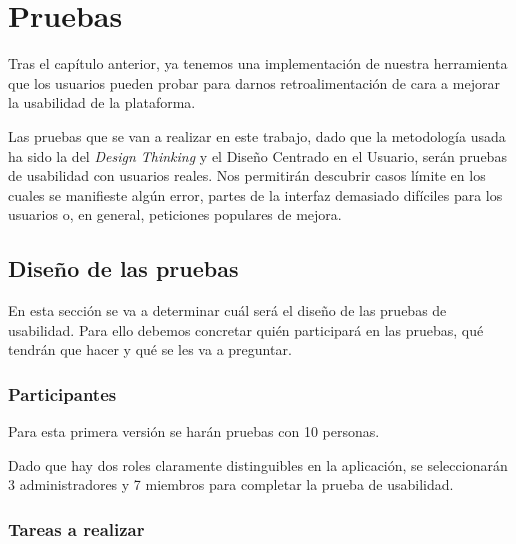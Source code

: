 \chapter{Pruebas}









Tras el capítulo anterior, ya tenemos una implementación de nuestra herramienta que los usuarios pueden probar para darnos retroalimentación de cara a mejorar la usabilidad de la plataforma.

Las pruebas que se van a realizar en este trabajo, dado que la metodología usada ha sido la del \textit{Design Thinking} y el Diseño Centrado en el Usuario, serán pruebas de usabilidad con usuarios reales. Nos permitirán descubrir casos límite en los cuales se manifieste algún error, partes de la interfaz demasiado difíciles para los usuarios o, en general, peticiones populares de mejora.

\section{Diseño de las pruebas}\label{section:disenyoPruebas}

En esta sección se va a determinar cuál será el diseño de las pruebas de usabilidad. Para ello debemos concretar quién participará en las pruebas, qué tendrán que hacer y qué se les va a preguntar.

\subsection{Participantes}

Para esta primera versión se harán pruebas con 10 personas.

Dado que hay dos roles claramente distinguibles en la aplicación, se seleccionarán 3 administradores y 7 miembros para completar la prueba de usabilidad.


\subsection{Tareas a realizar}

